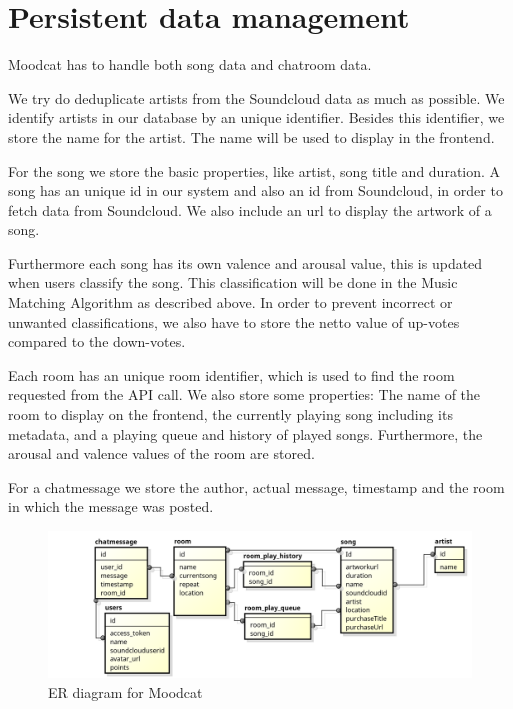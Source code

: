 \section{Persistent data management}
Moodcat has to handle both song data and chatroom data.

\par
We try do deduplicate artists from the Soundcloud data as much as possible. We identify artists in our database by an unique identifier. Besides this identifier, we store the name for the artist. The name will be used to display in the frontend.

\par
For the song we store the basic properties, like artist, song title and duration.
A song has an unique id in our system and also an id from \gls{Soundcloud}, in order to fetch data from Soundcloud.
We also include an url to display the artwork of a song.

Furthermore each song has its own \gls{valence} and \gls{arousal} value, this is updated when users classify the song.
This classification will be done in the Music Matching Algorithm as described above. In order to prevent incorrect or unwanted classifications, we also have to store the netto value of up-votes compared to the down-votes.

\par 
Each room has an unique room identifier, which is used to find the room requested from the API call.
We also store some properties: The name of the room to display on the frontend, the currently playing song including its metadata, 
and a playing queue and history of played songs.
Furthermore, the arousal and valence values of the room are stored.

\par
For a chatmessage we store the author, actual message, timestamp and the room in which the message was posted.

\begin{figure}[H]
\includegraphics[scale=.6]{erDiagram.png}
\caption{ER diagram for Moodcat}
\label{fig:ER diagram of the described entities}
\end{figure}

